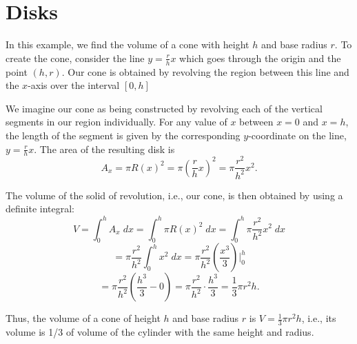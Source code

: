 \documentclass{ximera}
\begin{document}
\section{Disks}






\begin{example}[example 1]
In this example, we find the volume of a cone with height $h$ and base radius $r$.
To create the cone, consider the line $y = \frac{r}{h} x$ which goes through the origin and the point $(h,r)$.
Our cone is obtained by revolving the region between this line and the $x$-axis over the interval $[0,h]$



We imagine our cone as being constructed by revolving each of the vertical segments in our region individually.
For any value of $x$ between $x = 0$ and $x = h$, the length of the segment is given by the corresponding $y$-coordinate
on the line, $y = \frac{r}{h} x$. The area of the resulting disk is 
\[
A_x = \pi R(x)^2   = \pi \left(\frac{r}{h} x\right)^2  = \pi \frac{r^2}{h^2} x^2 .
\]


The volume of the solid of revolution, i.e., our cone, is then obtained by using a definite integral:
\[
V = \int_0^h A_x \; dx  = \int_0^h \pi R(x)^2 \; dx = \int_0^h \pi \frac{r^2}{h^2} x^2 \; dx 
\]
\[
= \pi \frac{r^2}{h^2}\int_0^h  x^2 \; dx = \pi \frac{r^2}{h^2} \left(\frac{x^3}{3}\right)\bigg|_0^h 
\]
\[
= \pi \frac{r^2}{h^2} \left(\frac{h^3}{3} - 0\right) = \pi \frac{r^2}{h^2} \cdot \frac{h^3}{3} = \frac13 \pi r^2 h.
\]

Thus, the volume of a cone of height $h$ and base radius $r$ is $V = \frac13 \pi r^2 h$, i.e., its volume is 1/3 of 
volume of the cylinder with the same height and radius.


\end{example}
\end{document}
